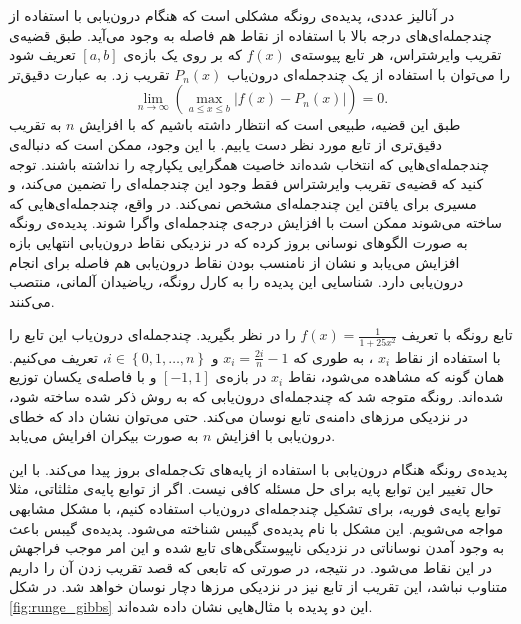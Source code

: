 \documentclass[12pt,onecolumn,a4paper]{article}
\begin{document}
در آنالیز عددی، پدیده‌ی رونگه مشکلی است که هنگام درون‌یابی با استفاده از چندجمله‌ای‌های درجه بالا با استفاده از نقاط هم فاصله به وجود می‌آید. طبق قضیه‌ی تقریب وایرشتراس،
هر تابع پیوسته‌ی 
$f(x)$
که بر روی یک بازه‌ی
$[a,b]$
تعریف شود را می‌توان با استفاده از یک چندجمله‌ای درون‌یاب
$P_n(x)$
تقریب زد. به عبارت دقیق‌تر
\begin{equation*}
    \lim_{n\rightarrow \infty}\left(\max _{{a\leq x\leq b}}\left|f(x)-P_{n}(x)\right|\right)=0.
\end{equation*}
طبق این قضیه، طبیعی است که انتظار داشته باشیم که با افزایش 
$n$
به تقریب دقیق‌تری از تابع مورد نظر دست یابیم. با این وجود، ممکن است که دنباله‌ی چندجمله‌ای‌هایی که انتخاب شده‌اند خاصیت همگرایی یکپارچه را نداشته باشند. توجه کنید که قضیه‌ی تقریب وایرشتراس فقط وجود این چندجمله‌ای را تضمین می‌کند، و مسیری برای یافتن این چندجمله‌ای مشخص نمی‌کند. در واقع، چندجمله‌ای‌هایی که ساخته می‌شوند ممکن است با افزایش درجه‌ی چندجمله‌ای واگرا شوند. پدیده‌ی رونگه به صورت الگوهای نوسانی بروز کرده که در نزدیکی نقاط درون‌یابی انتهایی بازه افزایش می‌یابد و نشان از نامنسب بودن نقاط درون‌یابی هم فاصله برای انجام درون‌یابی دارد. شناسایی این پدیده را به  کارل رونگه،
ریاضیدان آلمانی، منتصب می‌کنند.

تابع رونگه با تعریف 
$f(x)=\frac{1}{1+25x^2}$ 
را در نظر بگیرید. چندجمله‌ای درون‌یاب این تابع را با استفاده از نقاط 
$x_i$ 
، به طوری که
$x_{i}=\frac{2i}{n}-1$ 
و 
$i\in \left\{0,1,\dots ,n\right\}$،
تعریف می‌کنیم.
همان گونه که مشاهده می‌شود، نقاط 
$x_i$ 
در بازه‌ی 
$[-1,1]$ 
و با فاصله‌ی یکسان توزیع شده‌اند. رونگه متوجه شد که چندجمله‌ای درون‌یابی که به روش ذکر شده ساخته شود، در نزدیکی مرز‌های دامنه‌ی تابع نوسان می‌کند. حتی می‌توان نشان داد که خطای درون‌یابی با افزایش 
$n$ 
 به صورت بیکران افرایش می‌یابد.

پدیده‌ی رونگه هنگام درون‌یابی با استفاده از پایه‌های تک‌جمله‌ای 
بروز پیدا می‌کند. با این حال تغییر این توابع پایه برای حل مسئله کافی نیست. اگر از توابع پایه‌ی مثلثاتی، مثلا توابع پایه‌ی فوریه، برای تشکیل چندجمله‌ای درون‌یاب استفاده کنیم، با مشکل مشابهی مواجه می‌شویم. این مشکل  با نام پدیده‌ی گیبس
شناخته می‌شود. پدیده‌ی گیبس باعث به وجود آمدن نوساناتی در نزدیکی ناپیوستگی‌های تابع شده و این امر موجب فراجهش
در این نقاط می‌شود. در نتیجه، در صورتی که تابعی که قصد تقریب زدن آن را داریم متناوب نباشد، این تقریب از تابع نیز در نزدیکی مرزها دچار نوسان خواهد شد. در شکل 
\ref{fig:runge_gibbs} 
این دو پدیده با مثال‌هایی نشان داده‌ شده‌اند.
\end{document}
